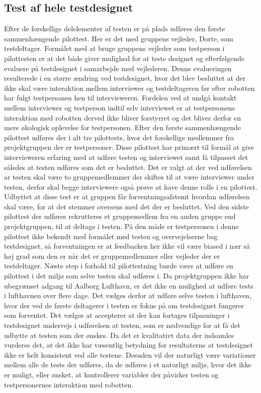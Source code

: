 \subsection*{Test af hele testdesignet}
Efter de forskellige delelementer af testen er på plads udføres den første sammenhængende pilottest. Her er det med gruppens vejleder, Dorte, som testdeltager. Formålet med at bruge gruppens vejleder som testperson i pilottesten er at det både giver mulighed for at teste designet og efterfølgende evaluere på testdesignet i samarbejde med vejlederen. Denne evalueringen resulterede i en større ændring ved testdesignet, hvor det blev besluttet at der ikke skal være interaktion mellem interviewer og testdeltageren før efter robotten har fulgt testpersonen hen til intervieweren. Fordelen ved at undgå kontakt mellem interviewer og testperson indtil selv interviewet er at testpersonens interaktion med robotten derved ikke bliver forstyrret og det bliver derfor en mere økologisk oplevelse for testpersonen. \blankline
%
Efter den første sammenhængende pilottest udføres der i alt tre pilottests, hvor det forskellige medlemmer fra projektgruppen der er testpersoner. Disse pilottest har primært til formål at give intervieweren erfaring med at udføre testen og interviewet samt få tilpasset det således at testen udføres som det er besluttet. Det er valgt at der ved udførelsen ar testen skal være to gruppemedlemmer der skiftes til at være interviewer under testen, derfor skal begge interviewere også prøve at have denne rolle i en pilottest. Udbyttet at disse test er at gruppen får forventningsafstemt hvordan udførelsen skal være, for at det stemmer oversens med det der er besluttet.\blankline
%
Ved den sidste pilottest der udføres rekrutteres et gruppemedlem fra en anden gruppe end projektgruppen, til at deltage i testen. På den måde er testpersonen i denne pilottest ikke bekendt med formålet med testen og overvejelserne bag testdesignet, så forventningen er at feedbacken her ikke vil være biased i nær så høj grad som den er når det er gruppemedlemmer eller vejleder der er testdeltager.\blankline
%
Næste step i forhold til pilottestning burde være at udføre en pilottest i det miljø som selve testen skal udføres i. Da projektgruppen ikke har ubegrænset adgang til Aalborg Lufthavn, er det ikke en mulighed at udføre tests i lufthavnen over flere dage. Det vælges derfor at udføre selve testen i lufthaven, hvor der ved de første deltagerer i testen er fokus på om testdesignet fungerer som forventet. Det vælges at accepterer at der kan fortages tilpasninger i testdesignet undervejs i udførelsen at testen, som er nødvendige for at få det udbytte at testen som der ønskes. Da det er kvalitativt data der indsamles vurderes det, at det ikke har væsentlig betydning for resultaterne at testdesignet ikke er helt konsistent ved alle testene. Desuden vil der naturligt være variationer mellem alle de tests der udføres, da de udføres i et naturligt miljø, hvor det ikke er muligt, eller ønsket, at kontrollerer variabler der påvirker testen og testpersonernes interaktion med robotten. 

